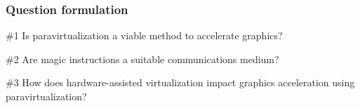 \begin{frame}
\frametitle{Question formulation}

\begin{block}{\#1}
  Is paravirtualization a viable method to accelerate graphics?
\end{block}

\begin{block}{\#2}
  Are magic instructions a suitable communications medium?
\end{block}

\begin{block}{\#3}
  How does hardware-assisted virtualization impact graphics acceleration using paravirtualization?
\end{block}

\end{frame}
